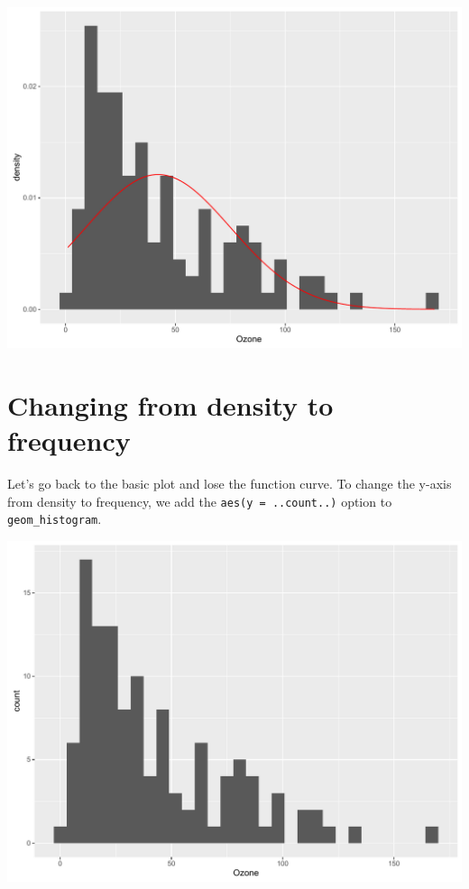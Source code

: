 \begin{center}\includegraphics[width=0.55\linewidth]{figures/histogram_2-1} \end{center}

\section{Changing from density to
frequency}\label{changing-from-density-to-frequency}

Let's go back to the basic plot and lose the function curve. To change
the y-axis from density to frequency, we add the
\texttt{aes(y\ =\ ..count..)} option to \texttt{geom\_histogram}.

\begin{Shaded}
\begin{Highlighting}[]
\StringTok{ }\NormalTok{(} \StringTok{ }
\StringTok{      }\NormalTok{(}\NormalTok{(} 
\end{Highlighting}
\end{Shaded}

\begin{center}\includegraphics[width=0.55\linewidth]{figures/histogram_3-1} \end{center}

